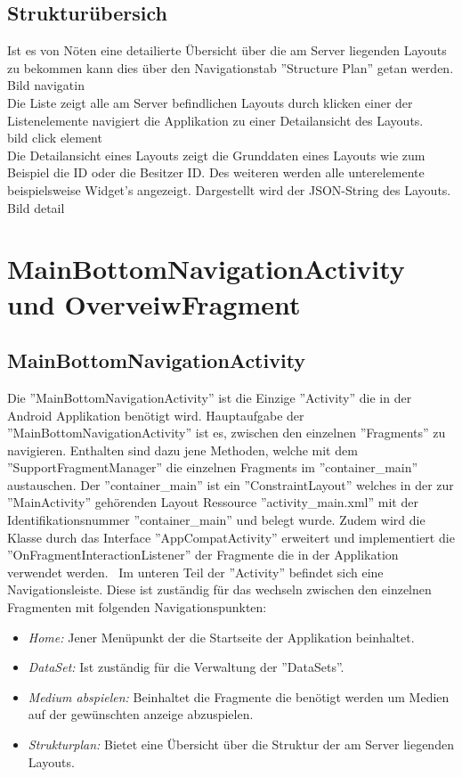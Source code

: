 \subsection{Strukturübersich}
Ist es von Nöten eine detailierte Übersicht über die am Server liegenden Layouts zu bekommen kann dies über den Navigationstab ''Structure Plan'' getan werden. 
\\
Bild navigatin
\\
Die Liste zeigt alle am Server befindlichen Layouts durch klicken einer der Listenelemente navigiert die Applikation zu einer Detailansicht des Layouts.
\\
bild click element
\\
Die Detailansicht eines Layouts zeigt die Grunddaten eines Layouts wie zum Beispiel die ID oder die Besitzer ID. Des weiteren werden alle unterelemente beispielsweise Widget's angezeigt. Dargestellt wird der JSON-String des Layouts.
\\
Bild detail
\\
\section{MainBottomNavigationActivity und OverveiwFragment}
\subsection{MainBottomNavigationActivity}
Die ''MainBottomNavigationActivity'' ist die Einzige ''Activity'' die in der Android Applikation benötigt wird. Hauptaufgabe der ''MainBottomNavigationActivity'' ist es, zwischen den einzelnen ''Fragments'' zu navigieren. Enthalten sind dazu jene Methoden, welche mit dem ''SupportFragmentManager'' die einzelnen Fragments im ''container\_main'' austauschen. Der ''container\_main'' ist ein ''ConstraintLayout'' welches in der zur ''MainActivity'' gehörenden Layout Ressource ''activity\_main.xml'' mit der Identifikationsnummer ''container\_main'' und  belegt wurde. Zudem wird die Klasse durch das Interface ''AppCompatActivity'' erweitert und implementiert die ''OnFragmentInteractionListener'' der Fragmente die in der Applikation verwendet werden. 
\
Im unteren Teil der ''Activity'' befindet sich eine Navigationsleiste. Diese ist zuständig für das wechseln zwischen den einzelnen Fragmenten mit folgenden Navigationspunkten: 

\begin{itemize}
	\item {\em Home:} Jener Menüpunkt der die Startseite der Applikation beinhaltet.
	\item {\em DataSet:} Ist zuständig für die Verwaltung der ''DataSets''.
	\item{\em Medium abspielen:} Beinhaltet die Fragmente die benötigt werden um Medien auf der gewünschten anzeige abzuspielen.
	\item {\em Strukturplan:} Bietet eine Übersicht über die Struktur der am Server liegenden Layouts.
\end{itemize}
